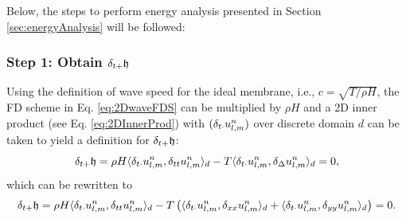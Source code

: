 
Below, the steps to perform energy analysis presented in Section \ref{sec:energyAnalysis} will be followed:
\subsubsection{Step 1: Obtain $\delta_{t+} \mathfrak{h}$}
Using the definition of wave speed for the ideal membrane, i.e., $c = \sqrt{T/ \rho H}$, the FD scheme in Eq. \eqref{eq:2DwaveFDS} can be multiplied by $\rho H$ and a 2D inner product (see Eq. \eqref{eq:2DInnerProd}) with $(\delta_{t\cdot} u_{l,m}^n)$ over discrete domain $d$ can be taken to yield a definition for $\delta_{t+} \mathfrak{h}$:
\begin{equation*}
    \delta_{t+} \mathfrak{h} = \rho H\langle \delta_{t\cdot} u_{l,m}^n , \delta_{tt} u_{l,m}^n\rangle_d - T \langle \delta_{t\cdot}u_{l,m}^n, \delta_{\Delta} u_{l,m}^n\rangle_d = 0,
\end{equation*}
which can be rewritten to
\begin{equation*}
    \delta_{t+} \mathfrak{h}= \rho H\langle \delta_{t\cdot} u_{l,m}^n , \delta_{tt} u_{l,m}^n\rangle_d - T \left(\langle \delta_{t\cdot}u_{l,m}^n, \delta_{xx} u_{l,m}^n\rangle_d + \langle \delta_{t\cdot}u_{l,m}^n, \delta_{yy} u_{l,m}^n\rangle_d \right) = 0.
\end{equation*}

